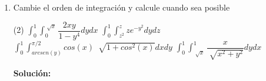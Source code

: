 \documentclass[12pt]{article}
\newenvironment{solucion}
{\begin{mdframed}[backgroundcolor=black!10]
		{\bf Solución:}\\
	}
	{
	\end{mdframed}
}
\newenvironment{preguntas}
{\begin{enumerate}\itemsep12pt
	}
	{
	\end{enumerate}
}
\begin{document}
\begin{preguntas}
\begin{solucion}
		$$= \displaystyle\int_0^1 y\left(e^{y^2/y} - e^{y^3/y}\right) dy$$
		$$= \displaystyle\int_0^1 ye^y - ye^{y^2} dy$$
		Para el primer termino se aplica integración por partes $(u=y, dv=e^y)$ y para el segundo termino se utiliza la sustitución $u=y^2$, obteniendo asi:
		$$\displaystyle\iint\limits_R e^{x/y} dA = \dfrac{1}{2}(e+1)$$
\end{solucion}
\item Cambie el orden de integración y calcule cuando sea posible
\begin{tasks}(2)
\task $\displaystyle\int_0^1 \displaystyle\int_0^{\sqrt[]{x}} \dfrac{2xy}{1-y^4} dydx$
\task $\displaystyle\int_0^1 \displaystyle\int_{z^2}^z ze^{-y^2} dydz$
\task $\displaystyle\int_0^1 \displaystyle\int_{arcsen(y)}^{\pi/2} cos(x)\ \sqrt[]{1+cos^2(x)} dxdy$
\task $\displaystyle\int_0^1 \displaystyle\int_{\sqrt[]{x}}^1 \dfrac{x}{\sqrt[]{x^2+y^2}} dydx$
\end{tasks}
\begin{solucion}


\end{solucion}
\end{preguntas}
\end{document}

